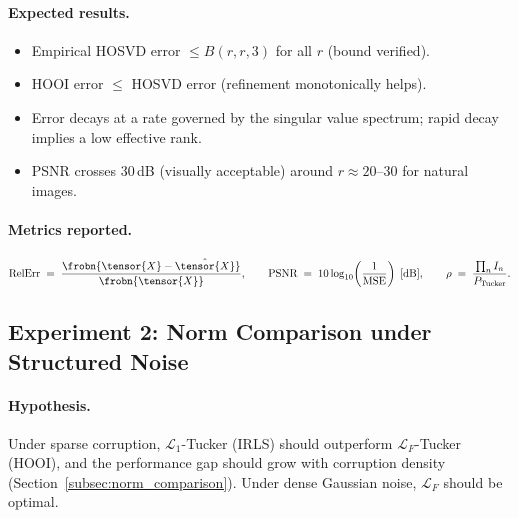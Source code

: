 \paragraph{Expected results.}
\begin{itemize}
  \item Empirical HOSVD error $\leq B(r,r,3)$ for all $r$ (bound verified).
  \item HOOI error $\leq$ HOSVD error (refinement monotonically helps).
  \item Error decays at a rate governed by the singular value spectrum;
        rapid decay implies a low effective rank.
  \item PSNR crosses 30\,dB (visually acceptable) around $r \approx 20$--30
        for natural images.
\end{itemize}

\paragraph{Metrics reported.}
\begin{equation}
  \text{RelErr}
  \;=\; \frac{\frobn{\tensor{X} - \hat{\tensor{X}}}}{\frobn{\tensor{X}}},
  \qquad
  \text{PSNR}
  \;=\; 10 \log_{10}\!\left(\frac{1}{\mathrm{MSE}}\right)
  \;\text{[dB]},
  \qquad
  \rho
  \;=\; \frac{\prod_n I_n}{P_{\mathrm{Tucker}}}.
  \label{eq:exp1_metrics}
\end{equation}

\subsection{Experiment 2: Norm Comparison under Structured Noise}
\label{subsec:exp_noise}

\paragraph{Hypothesis.}
Under sparse corruption, $\mathcal{L}_1$-Tucker (IRLS) should outperform
$\mathcal{L}_F$-Tucker (HOOI), and the performance gap should grow with
corruption density (Section~\ref{subsec:norm_comparison}).
Under dense Gaussian noise, $\mathcal{L}_F$ should be optimal.

